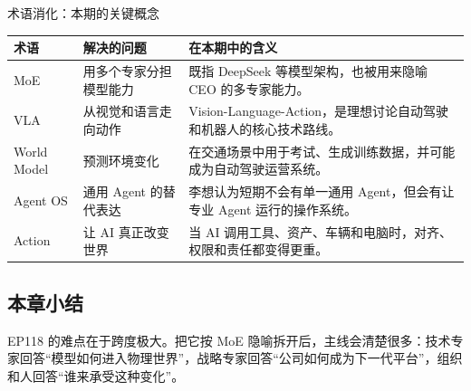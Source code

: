 \begin{knowledgebox}{术语消化：本期的关键概念}
\begin{tabularx}{\textwidth}{p{}p{}X}
\toprule
术语 & 解决的问题 & 在本期中的含义 \\
\midrule
MoE & 用多个专家分担模型能力 & 既指 DeepSeek 等模型架构，也被用来隐喻 CEO 的多专家能力。 \\
VLA & 从视觉和语言走向动作 & Vision-Language-Action，是理想讨论自动驾驶和机器人的核心技术路线。 \\
World Model & 预测环境变化 & 在交通场景中用于考试、生成训练数据，并可能成为自动驾驶运营系统。 \\
Agent OS & 通用 Agent 的替代表达 & 李想认为短期不会有单一通用 Agent，但会有让专业 Agent 运行的操作系统。 \\
Action & 让 AI 真正改变世界 & 当 AI 调用工具、资产、车辆和电脑时，对齐、权限和责任都变得更重。 \\
\bottomrule
\end{tabularx}
\end{knowledgebox}

\subsection{本章小结}

EP118 的难点在于跨度极大。把它按 MoE 隐喻拆开后，主线会清楚很多：技术专家回答“模型如何进入物理世界”，战略专家回答“公司如何成为下一代平台”，组织和人回答“谁来承受这种变化”。

